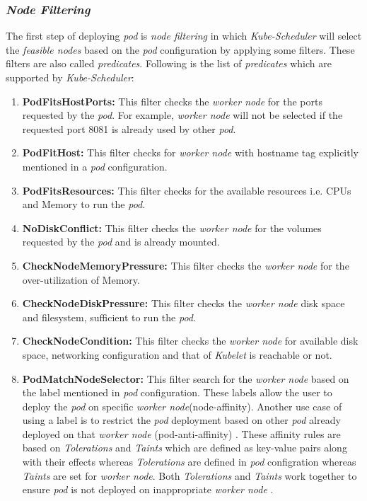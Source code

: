   \subsubsection{\emph{Node Filtering}}
  \label{sec:node-filter}
  The first step of deploying \emph{pod} is \emph{node filtering} in which \emph{Kube-Scheduler} will select the \emph{feasible nodes} based on the \emph{pod} configuration by applying some filters\cite{Santos2019}. These filters are also called \emph{predicates}. Following is the list of \emph{predicates} which are supported by \emph{Kube-Scheduler}\cite{k8s}:
  \begin{enumerate}
    \item \textbf{PodFitsHostPorts:} This filter checks the \emph{worker node} for the ports requested by the \emph{pod}. For example, \emph{worker node} will not be selected if the requested port 8081 is already used by other \emph{pod}.
    \item \textbf{PodFitHost:} This filter checks for \emph{worker node} with hostname tag explicitly mentioned in a \emph{pod} configuration.
    \item \textbf{PodFitsResources:} This filter checks for the available resources i.e. CPUs and Memory to run the \emph{pod}.
    \item \textbf{NoDiskConflict:} This filter checks the \emph{worker node} for the volumes requested by the \emph{pod} and is already mounted.
    \item \textbf{CheckNodeMemoryPressure:} This filter checks the \emph{worker node} for the over-utilization of Memory.
    \item \textbf{CheckNodeDiskPressure:} This filter checks the \emph{worker node} disk space and filesystem, sufficient to run the \emph{pod}.
    \item \textbf{CheckNodeCondition:} This filter checks the \emph{worker node} for available disk space, networking configuration and that of \emph{Kubelet} is reachable or not.
    \item \textbf{PodMatchNodeSelector:} This filter search for the \emph{worker node} based on the label mentioned in \emph{pod} configuration. These labels allow the user to deploy the \emph{pod} on specific \emph{worker node}(node-affinity)\cite{Santos2019}. Another use case of using a label is to restrict the \emph{pod} deployment based on other \emph{pod} already deployed on that \emph{worker node} (pod-anti-affinity) \cite{Santos2019}. These affinity rules are based on \emph{Tolerations} and \emph{Taints} which are defined as key-value pairs along with their effects whereas \emph{Tolerations} are defined in \emph{pod} configration whereas \emph{Taints} are set for \emph{worker node}\cite{k8s}. Both \emph{Tolerations} and \emph{Taints} work together to ensure \emph{pod} is not deployed on inappropriate \emph{worker node} \cite{k8s}.
  \end{enumerate}
